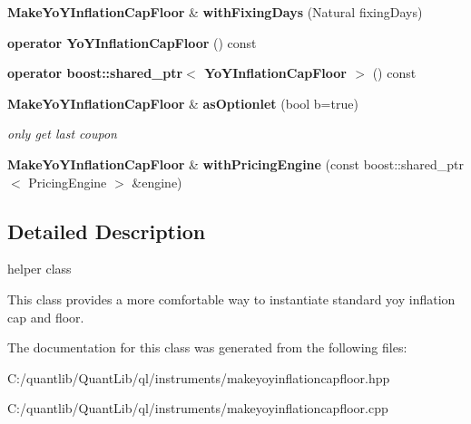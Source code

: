 \begin{DoxyCompactItemize}
\item 
{\bf Make\+Yo\+Y\+Inflation\+Cap\+Floor} \& {\bfseries with\+Fixing\+Days} (Natural fixing\+Days)\label{class_quant_lib_1_1_make_yo_y_inflation_cap_floor_ae48290f811495b3fb0e554d98f6a3e59}

\item 
{\bfseries operator Yo\+Y\+Inflation\+Cap\+Floor} () const \label{class_quant_lib_1_1_make_yo_y_inflation_cap_floor_a4ae7df4bf040586d602445be6751df5d}

\item 
{\bfseries operator boost\+::shared\+\_\+ptr$<$ Yo\+Y\+Inflation\+Cap\+Floor $>$} () const \label{class_quant_lib_1_1_make_yo_y_inflation_cap_floor_a00ac3a55647963fa36987b9aa7def77d}

\item 
{\bf Make\+Yo\+Y\+Inflation\+Cap\+Floor} \& {\bf as\+Optionlet} (bool b=true)\label{class_quant_lib_1_1_make_yo_y_inflation_cap_floor_a50a64efc681aa773e70a2cc360b58a03}

\begin{DoxyCompactList}\small\item\em only get last coupon \end{DoxyCompactList}\item 
{\bf Make\+Yo\+Y\+Inflation\+Cap\+Floor} \& {\bfseries with\+Pricing\+Engine} (const boost\+::shared\+\_\+ptr$<$ Pricing\+Engine $>$ \&engine)\label{class_quant_lib_1_1_make_yo_y_inflation_cap_floor_afa59e1ab992d37d3dd585a8c659f6e56}

\end{DoxyCompactItemize}


\subsection{Detailed Description}
helper class 

This class provides a more comfortable way to instantiate standard yoy inflation cap and floor. 

The documentation for this class was generated from the following files\+:\begin{DoxyCompactItemize}
\item 
C\+:/quantlib/\+Quant\+Lib/ql/instruments/makeyoyinflationcapfloor.\+hpp\item 
C\+:/quantlib/\+Quant\+Lib/ql/instruments/makeyoyinflationcapfloor.\+cpp\end{DoxyCompactItemize}
